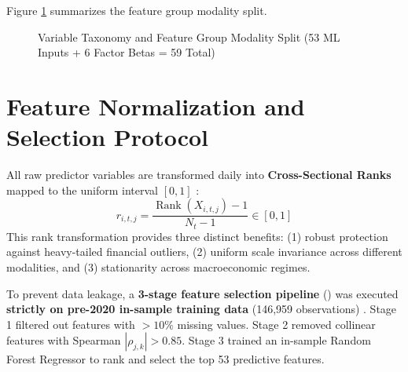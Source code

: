 Figure \ref{fig:ch3_modality_split} summarizes the feature group modality split.

\begin{figure}[H]
\centering
{}
\caption{Variable Taxonomy and Feature Group Modality Split (53 ML Inputs + 6 Factor Betas = 59 Total)}
\label{fig:ch3_modality_split}
\end{figure}

\section{Feature Normalization and Selection Protocol}
All raw predictor variables are transformed daily into \textbf{Cross-Sectional Ranks} mapped to the uniform interval $[0, 1]$ \citep{freyberger2020dissecting, gu2020empirical}:
\begin{equation}
r_{i,t,j} = \frac{\operatorname{Rank}(X_{i,t,j}) - 1}{N_t - 1} \in [0, 1]
\label{eq:ch3_rank}
\end{equation}
This rank transformation provides three distinct benefits: (1) robust protection against heavy-tailed financial outliers, (2) uniform scale invariance across different modalities, and (3) stationarity across macroeconomic regimes.

To prevent data leakage, a \textbf{3-stage feature selection pipeline} () was executed \textbf{strictly on pre-2020 in-sample training data} (146,959 observations) \citep{lopez2018advances}. Stage 1 filtered out features with $>10\%$ missing values. Stage 2 removed collinear features with Spearman $|\rho_{j,k}| > 0.85$. Stage 3 trained an in-sample Random Forest Regressor \citep{breiman2001random} to rank and select the top 53 predictive features.


